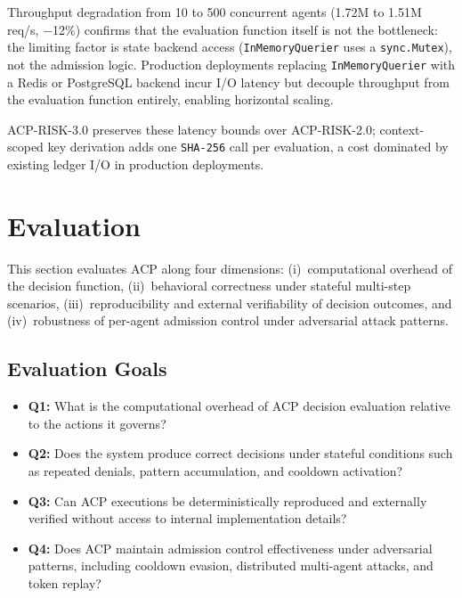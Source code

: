\documentclass[11pt]{article}
\theoremstyle{definition}
\begin{document}
Throughput degradation from 10 to 500 concurrent agents (1.72M to 1.51M req/s,
$-$12\%) confirms that the evaluation function itself is not the bottleneck:
the limiting factor is state backend access (\texttt{InMemoryQuerier} uses a
\texttt{sync.Mutex}), not the admission logic.
Production deployments replacing \texttt{InMemoryQuerier} with a Redis or
PostgreSQL backend incur I/O latency but decouple throughput from the
evaluation function entirely, enabling horizontal scaling.

ACP-RISK-3.0 preserves these latency bounds over ACP-RISK-2.0;
context-scoped key derivation adds one \texttt{SHA-256} call per evaluation,
a cost dominated by existing ledger I/O in production deployments.

\section{Evaluation}
\label{sec:evaluation}

This section evaluates ACP along four dimensions:
(i)~computational overhead of the decision function,
(ii)~behavioral correctness under stateful multi-step scenarios,
(iii)~reproducibility and external verifiability of decision outcomes,
and (iv)~robustness of per-agent admission control under adversarial attack patterns.

\subsection{Evaluation Goals}

\begin{itemize}[noitemsep]
  \item \textbf{Q1:} What is the computational overhead of ACP decision evaluation relative to the actions it governs?
  \item \textbf{Q2:} Does the system produce correct decisions under stateful conditions such as repeated denials, pattern accumulation, and cooldown activation?
  \item \textbf{Q3:} Can ACP executions be deterministically reproduced and externally verified without access to internal implementation details?
  \item \textbf{Q4:} Does ACP maintain admission control effectiveness under adversarial patterns, including cooldown evasion, distributed multi-agent attacks, and token replay?
\end{itemize}
\end{document}
